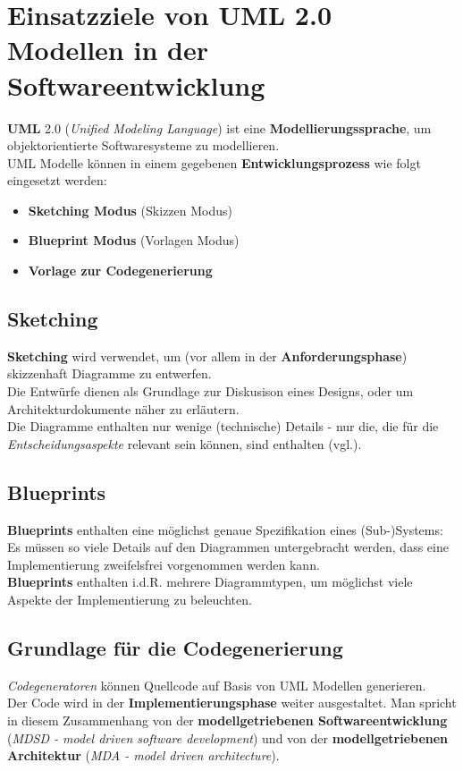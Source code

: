 \section{Einsatzziele von UML 2.0 Modellen in der Softwareentwicklung}

\textbf{UML} 2.0 (\textit{Unified Modeling Language}) ist eine \textbf{Modellierungssprache}, um objektorientierte Softwaresysteme zu modellieren.\\

\noindent
UML Modelle können in einem gegebenen \textbf{Entwicklungsprozess} wie folgt eingesetzt werden:

\begin{itemize}
    \item \textbf{Sketching Modus} (Skizzen Modus)
    \item \textbf{Blueprint Modus} (Vorlagen Modus)
    \item \textbf{Vorlage zur Codegenerierung}
\end{itemize}

\subsection*{Sketching}
\textbf{Sketching} wird verwendet, um (vor allem in der \textbf{Anforderungsphase}) skizzenhaft Diagramme zu entwerfen.\\
Die Entwürfe dienen als Grundlage zur Diskusison eines Designs, oder um Architekturdokumente näher zu erläutern.\\
Die Diagramme enthalten nur wenige (technische) Details - nur die, die für die \textit{Entscheidungsaspekte} relevant sein können, sind enthalten (vgl.\cite[2]{Buh09}).

\subsection*{Blueprints}
\textbf{Blueprints} enthalten eine möglichst genaue Spezifikation eines (Sub-)Systems: Es müssen so viele Details auf den Diagrammen untergebracht werden, dass eine Implementierung zweifelsfrei vorgenommen werden kann.\\
\textbf{Blueprints} enthalten i.d.R. mehrere Diagrammtypen, um möglichst viele Aspekte der Implementierung zu beleuchten.

\subsection*{Grundlage für die Codegenerierung}
\textit{Codegeneratoren} können Quellcode auf Basis von UML Modellen generieren.\\
Der Code wird in der \textbf{Implementierungsphase} weiter ausgestaltet.
Man spricht in diesem Zusammenhang von der \textbf{modellgetriebenen Softwareentwicklung} (\textit{MDSD - model driven software development}) und von der \textbf{modellgetriebenen Architektur} (\textit{MDA - model driven architecture}).


